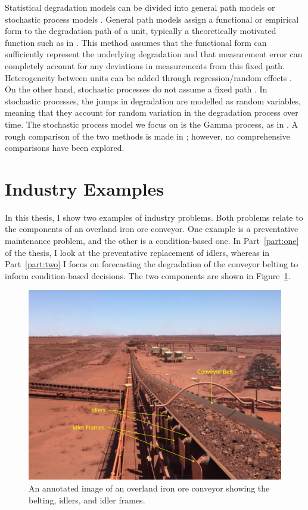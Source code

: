 Statistical degradation models can be divided into general path models or stochastic process models \citep{pandey2006, si2011}. General path models assign a functional or empirical form to the degradation path of a unit, typically a theoretically motivated function such as in \citep{robinson2000}. This method assumes that the functional form can sufficiently represent the underlying degradation and that measurement error can completely account for any deviations in measurements from this fixed path. Heterogeneity between units can be added through regression/random effects \citep{robinson2000}. On the other hand, stochastic processes do not assume a fixed path \citep{pandey2006}. In stochastic processes, the jumps in degradation are modelled as random variables, meaning that they account for random variation in the degradation process over time. The stochastic process model we focus on is the Gamma process, as in \citep{lawless2004}. A rough comparison of the two methods is made in \citep{ye2015}; however, no comprehensive comparisons have been explored.

\section{Industry Examples}
\label{sec:industry-data}

In this thesis, I show two examples of industry problems. Both problems relate to the components of an overland iron ore conveyor. One example is a preventative maintenance problem, and the other is a condition-based one. In Part~\ref{part:one} of the thesis, I look at the preventative replacement of idlers, whereas in Part~\ref{part:two} I focus on forecasting the degradation of the conveyor belting to inform condition-based decisions. The two components are shown in Figure~\ref{fig:belt_and_frame}.

\begin{figure}
  \centering
  \includegraphics[width=1\textwidth]{./figures/cvr_example_edit_annotation.jpg}
  \caption{An annotated image of an overland iron ore conveyor \citep{australianmining2020} showing the belting, idlers, and idler frames.}
  \label{fig:belt_and_frame}
\end{figure}

